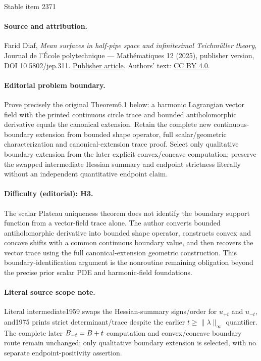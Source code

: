 \documentclass[11pt]{article}
\makeatletter
\DeclareRobustCommand{\mathbbm}[1]{\csname jepbb@#1\endcsname}
\theoremstyle{plain}
\theoremstyle{definition}
\makeatother
\begin{document}
\begin{center}{\Large Stable item 2371}\end{center}
\paragraph{Source and attribution.}
Farid Diaf, \emph{Mean surfaces in half-pipe space and infinitesimal Teichmüller theory}, Journal de l’École polytechnique — Mathématiques 12 (2025), publisher version, DOI 10.5802/jep.311. \href{https://jep.centre-mersenne.org/articles/10.5802/jep.311/}{Publisher article}. Authors' text: \href{https://creativecommons.org/licenses/by/4.0/}{CC BY 4.0}.
\paragraph{Editorial problem boundary.}
Prove precisely the original Theorem6.1 below: a harmonic Lagrangian vector field with the printed continuous circle trace and bounded antiholomorphic derivative equals the canonical extension. Retain the complete new continuous-boundary extension from bounded shape operator, full scalar/geometric characterization and canonical-extension trace proof. Select only qualitative boundary extension from the later explicit convex/concave computation; preserve the swapped intermediate Hessian summary and endpoint strictness literally without an independent quantitative endpoint claim.
\paragraph{Difficulty (editorial): H3.}
The scalar Plateau uniqueness theorem does not identify the boundary support function from a vector-field trace alone. The author converts bounded antiholomorphic derivative into bounded shape operator, constructs convex and concave shifts with a common continuous boundary value, and then recovers the vector trace using the full canonical-extension geometric construction. This boundary-identification argument is the nonroutine remaining obligation beyond the precise prior scalar PDE and harmonic-field foundations.
\paragraph{Literal source scope note.}
Literal intermediate1959 swaps the Hessian-summary signs/order for $u_{+t}$ and $u_{-t}$, and1975 prints strict determinant/trace despite the earlier $t\geq\lVert\lambda\rVert_\infty$ quantifier. The complete later $B_{-t}=B+t\mathbbm{1}$ computation and convex/concave boundary route remain unchanged; only qualitative boundary extension is selected, with no separate endpoint-positivity assertion.
\end{document}
